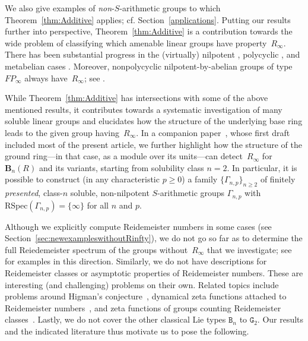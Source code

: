 \documentclass[a4paper,11pt]{amsart}
\numberwithin{equation}{section}
\theoremstyle{plain}
\theoremstyle{definition}
\newcommand{\mbB}{\mathbf{B}} %
\newcommand{\Ri}{R_{\infty}} %
\newcommand{\RSpec}{\mathrm{RSpec}}
\begin{document}
We also give examples of \emph{non}-$S$-arithmetic groups to which Theorem~\ref{thm:Additive} applies; cf. Section~\ref{applications}. Putting our results further into perspective, Theorem~\ref{thm:Additive} is a contribution towards the wide problem of classifying which amenable linear groups have property~$\Ri$. There has been substantial progress in the (virtually) nilpotent \cite{DacibergWongCrelle,Romankov,KarelDacibergNil,TimurUniTri}, polycyclic \cite{KarelPenni,KarelSam,KarelSamIrisSolv}, and metabelian cases \cite{TabackWong0,DacibergWongWreath,FelshtynDacibergMetabelian}. Moreover, nonpolycyclic nilpotent-by-abelian groups of type~$FP_\infty$ always have~$\Ri$; see \cite[Theorem~4.3]{DesiDaciberg}. 

While Theorem~\ref{thm:Additive} has intersections with some of the above mentioned results, it contributes towards a systematic investigation of many soluble linear groups and elucidates how the structure of the underlying base ring leads to the given group having~$\Ri$. In a companion paper~\cite{Bn1}, whose first draft included most of the present article, we further highlight how the structure of the ground ring---in that case, as a module over its units---can detect~$\Ri$ for $\mbB_n(R)$ and its variants, starting from solubility class $n = 2$. In particular, it is possible to construct (in any characteristic $p \geq 0$) a family $\{\Gamma_{n,p}\}_{n \geq 2}$ of finitely \emph{presented}, class-$n$ soluble, non-nilpotent $S$-arithmetic groups $\Gamma_{n,p}$ with $\RSpec(\Gamma_{n,p}) = \{\infty\}$ for all $n$ and $p$.

Although we explicitly compute Reidemeister numbers in some cases (see Section~\ref{sec:newexampleswithoutRinfty}), we do not go so far as to determine the full Reiedemeister spectrum of the groups without~$\Ri$ that we investigate; see \cite{KarelPenni,FelshtynDacibergMetabelian,KarelKaiserSam,KarelSamIrisSolv} for examples in this direction. Similarly, we do not have descriptions for Reidemeister classes or asymptotic properties of Reidemeister numbers. These are interesting (and challenging) problems on their own. Related topics include problems around Higman's conjecture~\cite{HalasiPalfy,Higman,VLA}, dynamical zeta functions attached to Reidemeister numbers~\cite{DekTerVandeBus,FelshtynHill,FelshtynZietek}, and zeta functions of groups counting Reidemeister classes~\cite{PaulaII,ask,RoVo19,duSau05}. Lastly, we do not cover the other classical Lie types $\mathtt{B}_n$ to $\mathtt{G}_2$. Our results and the indicated literature thus motivate us to pose the following.
\end{document}

